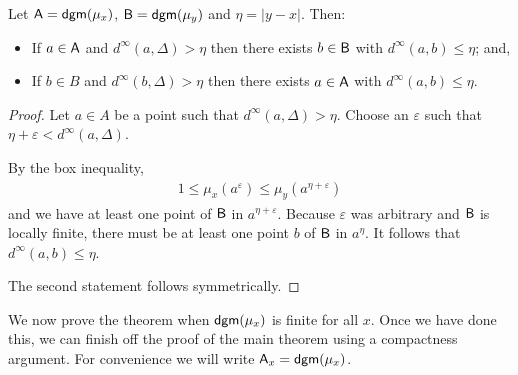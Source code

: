 \begin{lemma}
Let $\mathsf{A} = \mathsf{dgm}(\mu_x)$, $\mathsf{B} = \mathsf{dgm}(\mu_y)$ and $\eta = |y-x|$. Then:
\begin{itemize}
\item If $a \in \mathsf{A}$ and $d^\infty(a, \Delta) > \eta$ then there exists $b \in \mathsf{B}$ with $d^\infty(a, b) \leq \eta$; and,
\item If $b \in B$ and $d^\infty(b, \Delta) > \eta$ then there exists $a \in \mathsf{A}$ with $d^\infty(a, b) \leq \eta$.
\end{itemize}
\end{lemma}
\begin{proof}
Let $a \in A$ be a point such that $d^\infty(a, \Delta) > \eta$. Choose an $\varepsilon$ such that $\eta + \varepsilon < d^\infty(a, \Delta)$. 

By the box inequality, 
\begin{align*}
1 \leq \mu_x(a^\varepsilon) \leq \mu_y(a^{\eta + \varepsilon})
\end{align*}
and we have at least one point of $\mathsf{B}$ in $a^{\eta + \varepsilon}$. Because $\varepsilon$ was arbitrary and $\mathsf{B}$ is locally finite, there must be at least one point $b$ of $\mathsf{B}$ in $a^\eta$. It follows that $d^\infty(a, b) \leq \eta$.

The second statement follows symmetrically.
\end{proof}

We now prove the theorem when $\mathsf{dgm}(\mu_x)$ is finite for all $x$. Once we have done this, we can finish off the proof of the main theorem using a compactness argument. For convenience we will write $\mathsf{A}_x = \mathsf{dgm}(\mu_x)$.

